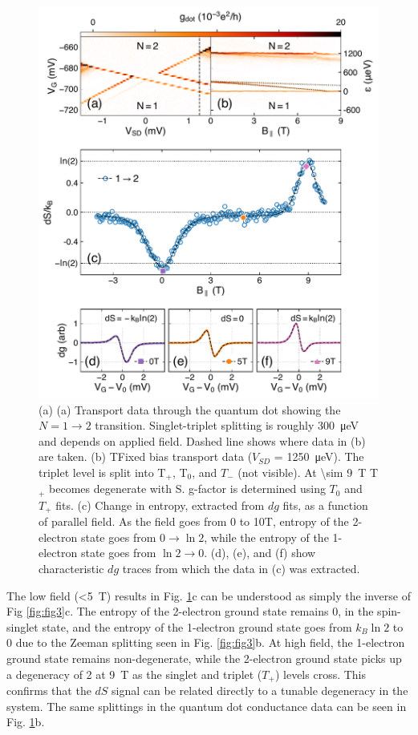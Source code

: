 \documentclass[twocolumn,showpacs,preprintnumbers,amsmath,amssymb,pra,aps,superscriptaddress]{revtex4-1}
\begin{document}
\begin{figure}
        \includegraphics[width=1.0\columnwidth]{../figures/figure_4.pdf}
        \caption{\label{fig:fig4}(a) (a) Transport data through the quantum dot showing the $N=1 \rightarrow 2$ transition. Singlet-triplet splitting is roughly \SI{300}{\micro\electronvolt} and depends on applied field. Dashed line shows where data in (b) are taken. (b) TFixed bias transport data ($V_{SD}$ = \SI{1250}{\micro\electronvolt}). The triplet level is split into T$_+$, T$_0$, and $T_{-}$ (not visible). At \SI[input-protect-tokens]{\sim 9}{\tesla} T$_+$ becomes degenerate with S. g-factor is determined using $T_0$ and $T_+$ fits. (c) Change in entropy, extracted from $dg$ fits, as a function of parallel field. As the field goes from 0 to 10T, entropy of the 2-electron state goes from $0  \rightarrow \ln{2}$, while the entropy of the 1-electron state goes from $\ln{2} \rightarrow 0$. (d), (e), and (f) show characteristic $dg$ traces from which the data in (c) was extracted.}
\end{figure}

The low field (\SI{<5}{\tesla}) results in Fig. \ref{fig:fig4}c can be understood as simply the inverse of Fig \ref{fig:fig3}c. The entropy of the 2-electron ground state remains $0$, in the spin-singlet state, and the entropy of the 1-electron ground state goes from $k_B\ln{2}$ to $0$ due to the Zeeman splitting seen in Fig. \ref{fig:fig3}b. At high field, the 1-electron ground state remains non-degenerate, while the 2-electron ground state picks up a degeneracy of 2 at \SI{9}{\tesla} as the singlet and triplet ($T_+$) levels cross. This confirms that the $dS$ signal can be related directly to a tunable degeneracy in the system. The same splittings in the quantum dot conductance data can be seen in Fig. \ref{fig:fig4}b.
\end{document}
